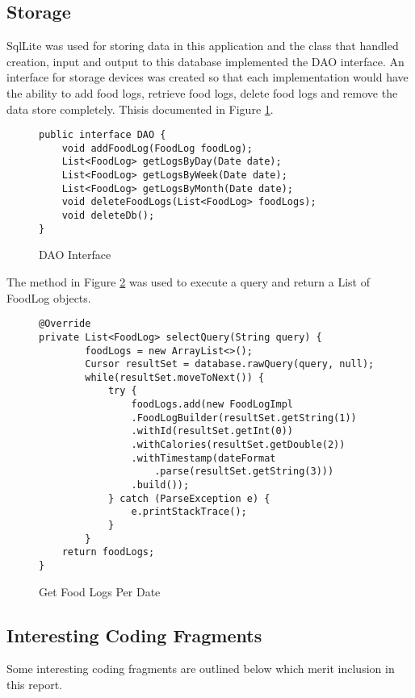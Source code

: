 \tocless\subsection{Storage}
SqlLite was used for storing data in this application and the class that handled creation, input and output to this database implemented the DAO interface.
An interface for storage devices was created so that each implementation would have the ability to add food logs, retrieve food logs, delete food logs and remove the data store completely.
Thisis documented in Figure \ref{lst:daoInterface}.
\begin{figure}[h]
\caption{DAO Interface}
\label{lst:daoInterface}
\begin{lstlisting}[style=Java]
public interface DAO {
    void addFoodLog(FoodLog foodLog);
    List<FoodLog> getLogsByDay(Date date);
    List<FoodLog> getLogsByWeek(Date date);
    List<FoodLog> getLogsByMonth(Date date);
    void deleteFoodLogs(List<FoodLog> foodLogs);
    void deleteDb();
}
\end{lstlisting}
\end{figure}

The method in Figure \ref{lst:getLogs} was used to execute a query and return a List of FoodLog objects.
\begin{figure}[h]
\caption{Get Food Logs Per Date}
\label{lst:getLogs}
\begin{lstlisting}[style=Java]
@Override
private List<FoodLog> selectQuery(String query) {
        foodLogs = new ArrayList<>();
        Cursor resultSet = database.rawQuery(query, null);
        while(resultSet.moveToNext()) {
            try {
                foodLogs.add(new FoodLogImpl
                .FoodLogBuilder(resultSet.getString(1))
                .withId(resultSet.getInt(0))
                .withCalories(resultSet.getDouble(2))
                .withTimestamp(dateFormat
                    .parse(resultSet.getString(3)))
                .build());
            } catch (ParseException e) {
                e.printStackTrace();
            }
        }
    return foodLogs;
}
\end{lstlisting}
\end{figure}

\tocless\subsection{Interesting Coding Fragments}
Some interesting coding fragments are outlined below which merit inclusion in this report.

